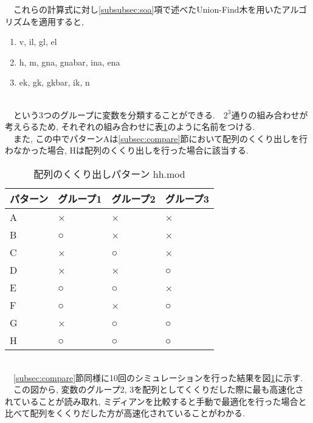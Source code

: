 　これらの計算式に対し\ref{subsubsec:soa}項で述べたUnion-Find木を用いたアルゴリズムを適用すると,\\
\begin{enumerate}
  \item v, il, gl, el
  \item h, m, gna, gnabar, ina, ena
  \item ek, gk, gkbar, ik, n
\end{enumerate}~\\
　という3つのグループに変数を分類することができる.　$2^3$通りの組み合わせが考えらるため, それぞれの組み合わせに表\ref{table:merge-array-pattern}のように名前をつける.\\
　また, この中でパターンAは\ref{subsec:compare}節において配列のくくり出しを行わなかった場合, Hは配列のくくり出しを行った場合に該当する.\\
\begin{table}[htb]
  \caption {配列のくくり出しパターン hh.mod}
  \begin{center}
    \begin{tabular}{|p{3cm}|p{3cm}|p{3cm}|p{3cm}|}
      \hline
      パターン & グループ1 & グループ2 & グループ3\\ \hline
      A & × & × & ×\\ \hline
      B & ○ & × & ×\\ \hline
      C & × & ○ & ×\\ \hline
      D & × & × & ○\\ \hline
      E & ○ & ○ & ×\\ \hline
      F & ○ & × & ○\\ \hline
      G & × & ○ & ○\\ \hline
      H & ○ & ○ & ○\\ \hline
    \end{tabular}
    \label{table:merge-array-pattern}
  \end{center}
\end{table}~\\
\vspace{10cm}
　\ref{subsec:compare}節同様に10回のシミュレーションを行った結果を図\ref{table:merge-array-pattern}に示す.\\
　この図から, 変数のグループ2, 3を配列としてくくりだした際に最も高速化されていることが読み取れ,
ミディアンを比較すると手動で最適化を行った場合と比べて配列をくくりだした方が高速化されていることがわかる.\\

\clearpage
